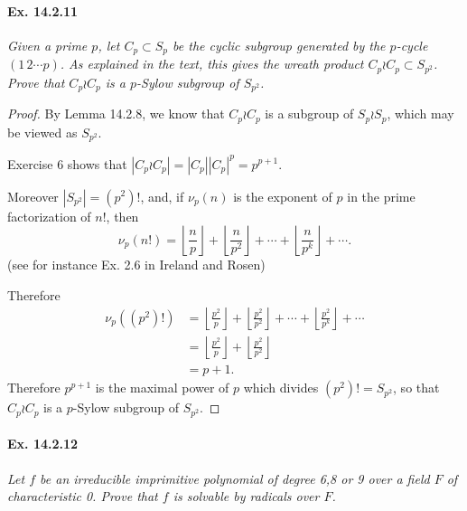 \documentclass[11pt,a4paper]{article}
\begin{document}
\paragraph{Ex. 14.2.11}{\it
Given a prime $p$, let $C_p \subset S_p$ be the cyclic subgroup generated by the $p$-cycle $(1\,2\cdots p)$. As explained in the text, this gives the wreath product $C_p \wr C_p \subset S_{p^2}$. Prove that $C_p \wr C_p$ is a $p$-Sylow subgroup of $S_{p^2}$.
}
\begin{proof}
By Lemma 14.2.8, we know that $C_p \wr C_p$ is a subgroup of $S_p \wr S_p$, which may be viewed as $S_{p^2}$.

Exercise 6 shows that $|C_p \wr C_p| = |C_p| |C_p|^p = p^{p+1}$.

Moreover $|S_{p^2}| = (p^2)!$, and, if $\nu_p(n)$ is the exponent of $p$ in the prime factorization of $n!$, then
$$\nu_p(n!) =\left \lfloor \frac{n}{p} \right \rfloor +  \left \lfloor \frac{n}{p^2}\right  \rfloor + \cdots + \left \lfloor \frac{n}{p^k} \right \rfloor + \cdots.$$
(see for instance Ex. 2.6 in Ireland and Rosen)
 
Therefore\begin{align*}
\nu_p((p^2)!) &=\left \lfloor \frac{p^2}{p} \right \rfloor +  \left \lfloor \frac{p^2 }{p^2}\right  \rfloor + \cdots + \left \lfloor \frac{p^2}{p^k} \right \rfloor + \cdots\\
&=\left \lfloor \frac{p^2}{p} \right \rfloor +  \left \lfloor \frac{p^2 }{p^2}\right  \rfloor\\
&=p + 1.
\end{align*}
Therefore $p^{p+1}$ is the maximal power of $p$ which divides $(p^2)! = S_{p^2}$, so that $C_p \wr C_p$ is a $p$-Sylow subgroup of $S_{p^2}$.
\end{proof}


\paragraph{Ex. 14.2.12}{\it Let $f$ be an irreducible imprimitive polynomial of degree 6,8 or 9 over a field $F$ of characteristic 0. Prove that $f$ is solvable by radicals over $F$.
}
\end{document}
